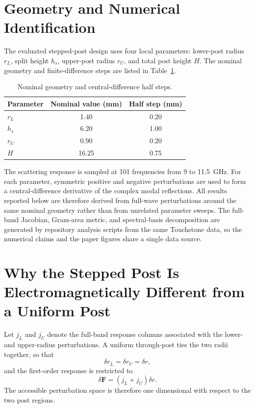\documentclass[journal]{IEEEtran}
\begin{document}
\section{Geometry and Numerical Identification}
The evaluated stepped-post design uses four local parameters: lower-post radius $r_L$, split height $h_s$, upper-post radius $r_U$, and total post height $H$.
The nominal geometry and finite-difference steps are listed in Table~\ref{tab:geom}.

\begin{table}[t]
\centering
\caption{Nominal geometry and central-difference half steps.}
\label{tab:geom}
\begin{tabular}{lcc}
\toprule
Parameter & Nominal value (mm) & Half step (mm)\\
\midrule
$r_L$ & 1.40 & 0.20\\
$h_s$ & 6.20 & 1.00\\
$r_U$ & 0.90 & 0.20\\
$H$   & 16.25 & 0.75\\
\bottomrule
\end{tabular}
\end{table}

The scattering response is sampled at 101 frequencies from 9 to 11.5~GHz.
For each parameter, symmetric positive and negative perturbations are used to form a central-difference derivative of the complex modal reflections.
All results reported below are therefore derived from full-wave perturbations around the same nominal geometry rather than from unrelated parameter sweeps.
The full-band Jacobian, Gram-area metric, and spectral-basis decomposition are generated by repository analysis scripts from the same Touchstone data, so the numerical claims and the paper figures share a single data source.

\section{Why the Stepped Post Is Electromagnetically Different from a Uniform Post}
Let $j_L$ and $j_U$ denote the full-band response columns associated with the lower- and upper-radius perturbations.
A uniform through-post ties the two radii together, so that
\begin{equation}
\delta r_L=\delta r_U=\delta r,
\end{equation}
and the first-order response is restricted to
\begin{equation}
\delta\bm F=(j_L+j_U)\delta r.
\end{equation}
The accessible perturbation space is therefore one dimensional with respect to the two post regions.
\end{document}
